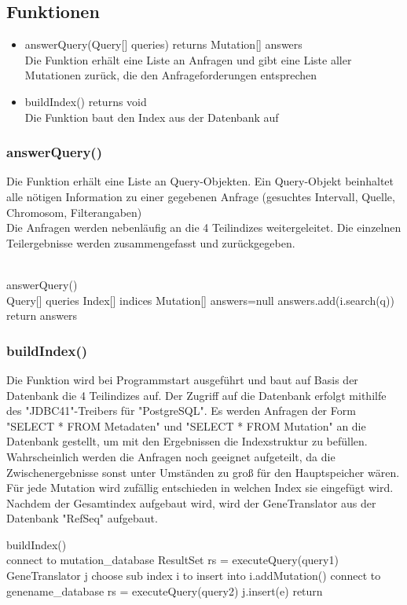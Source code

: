 \documentclass[]{article}
\begin{document}
\subsection{Funktionen}
\begin{itemize}
\item answerQuery(Query[] queries) returns Mutation[] answers\\
Die Funktion erhält eine Liste an Anfragen und gibt eine Liste aller Mutationen zurück, die den Anfrageforderungen entsprechen
\item buildIndex() returns void\\
Die Funktion baut den Index aus der Datenbank auf
\end{itemize}
\subsubsection{answerQuery()}
Die Funktion erhält eine Liste an Query-Objekten. Ein Query-Objekt beinhaltet alle nötigen Information zu einer gegebenen Anfrage (gesuchtes Intervall, Quelle, Chromosom, Filterangaben)\\
Die Anfragen werden nebenläufig an die 4 Teilindizes weitergeleitet. Die einzelnen Teilergebnisse werden zusammengefasst und zurückgegeben.\\
\\
\begin{algorithm}
answerQuery()\\
Query[] queries\;
Index[] indices\;
Mutation[] answers=null\;
{
{answers.add(i.search(q))\;}
}
return answers\;
\end{algorithm}


\subsubsection{buildIndex()}
Die Funktion wird bei Programmstart ausgeführt und baut auf Basis der Datenbank die 4 Teilindizes auf. Der Zugriff auf die Datenbank erfolgt mithilfe des "JDBC41"-Treibers für "PostgreSQL". Es werden Anfragen der Form "SELECT * FROM Metadaten" und "SELECT * FROM Mutation" an die Datenbank gestellt, um mit den Ergebnissen die Indexstruktur zu befüllen. Wahrscheinlich werden die Anfragen noch geeignet aufgeteilt, da die Zwischenergebnisse sonst unter Umständen zu groß für den Hauptspeicher wären.\\
Für jede Mutation wird zufällig entschieden in welchen Index sie eingefügt wird.\\
Nachdem der Gesamtindex aufgebaut wird, wird der GeneTranslator aus der Datenbank "RefSeq" aufgebaut.
\begin{algorithm}
buildIndex()\\
\KwData{--}
connect to mutation\_database\;
ResultSet rs = executeQuery(query1)\;
GeneTranslator j\;
{choose sub index i to insert into\;
i.addMutation()\;}
connect to genename\_database\;
rs = executeQuery(query2)\;
{j.insert(e)\;}
return\;
\end{algorithm}
\end{document}
